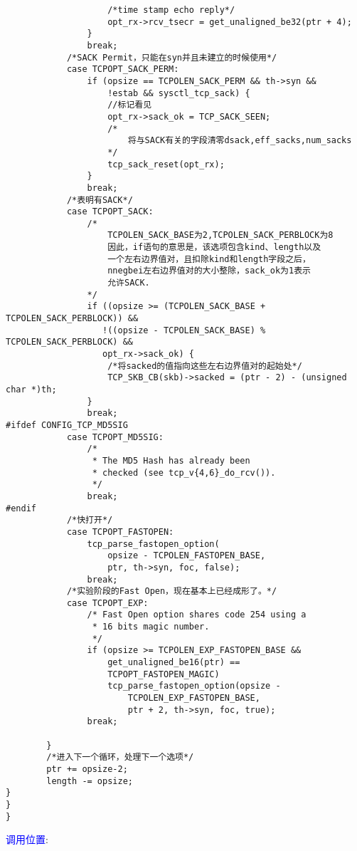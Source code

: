 \begin{verbatim}
                    /*time stamp echo reply*/
                    opt_rx->rcv_tsecr = get_unaligned_be32(ptr + 4);
                }
                break;
            /*SACK Permit，只能在syn并且未建立的时候使用*/
            case TCPOPT_SACK_PERM:
                if (opsize == TCPOLEN_SACK_PERM && th->syn &&
                    !estab && sysctl_tcp_sack) {
                    //标记看见
                    opt_rx->sack_ok = TCP_SACK_SEEN;
                    /*
                        将与SACK有关的字段清零dsack,eff_sacks,num_sacks
                    */
                    tcp_sack_reset(opt_rx);
                }
                break;
            /*表明有SACK*/
            case TCPOPT_SACK:
                /*
                    TCPOLEN_SACK_BASE为2,TCPOLEN_SACK_PERBLOCK为8
                    因此，if语句的意思是，该选项包含kind、length以及
                    一个左右边界值对，且扣除kind和length字段之后，
                    nnegbei左右边界值对的大小整除，sack_ok为1表示
                    允许SACK.
                */
                if ((opsize >= (TCPOLEN_SACK_BASE + TCPOLEN_SACK_PERBLOCK)) &&
                   !((opsize - TCPOLEN_SACK_BASE) % TCPOLEN_SACK_PERBLOCK) &&
                   opt_rx->sack_ok) {
                    /*将sacked的值指向这些左右边界值对的起始处*/
                    TCP_SKB_CB(skb)->sacked = (ptr - 2) - (unsigned char *)th;
                }
                break;
#ifdef CONFIG_TCP_MD5SIG
            case TCPOPT_MD5SIG:
                /*
                 * The MD5 Hash has already been
                 * checked (see tcp_v{4,6}_do_rcv()).
                 */
                break;
#endif
            /*快打开*/
            case TCPOPT_FASTOPEN:
                tcp_parse_fastopen_option(
                    opsize - TCPOLEN_FASTOPEN_BASE,
                    ptr, th->syn, foc, false);
                break;
            /*实验阶段的Fast Open，现在基本上已经成形了。*/
            case TCPOPT_EXP:
                /* Fast Open option shares code 254 using a
                 * 16 bits magic number.
                 */
                if (opsize >= TCPOLEN_EXP_FASTOPEN_BASE &&
                    get_unaligned_be16(ptr) ==
                    TCPOPT_FASTOPEN_MAGIC)
                    tcp_parse_fastopen_option(opsize -
                        TCPOLEN_EXP_FASTOPEN_BASE,
                        ptr + 2, th->syn, foc, true);
                break;

        }
        /*进入下一个循环，处理下一个选项*/
        ptr += opsize-2;
        length -= opsize;
}
}
}
\end{verbatim}
        \textcolor{blue}{调用位置}:

